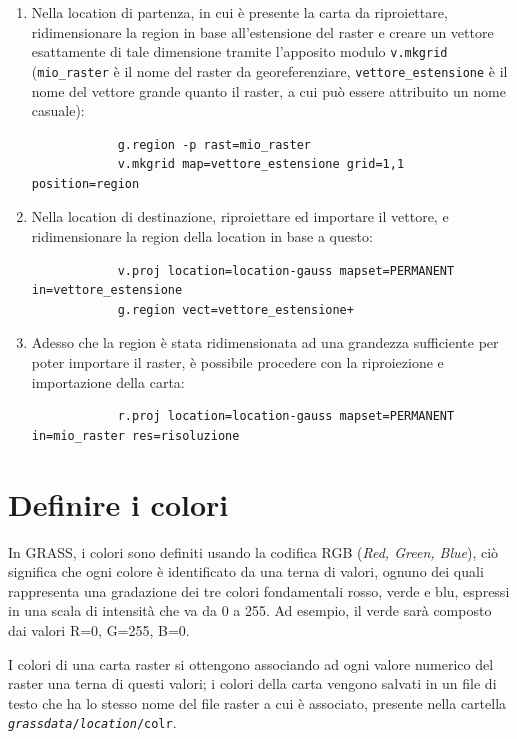 	\begin{enumerate}
		\item Nella location di partenza, in cui è presente la carta da riproiettare, ridimensionare la region in base all'estensione del raster e creare un vettore esattamente di tale dimensione tramite l'apposito modulo \texttt{v.mkgrid} (\texttt{mio\_raster} è il nome del raster da georeferenziare, \texttt{vettore\_estensione} è il nome del vettore grande quanto il raster, a cui può essere attribuito un nome casuale):

		\begin{verbatim}
			g.region -p rast=mio_raster
			v.mkgrid map=vettore_estensione grid=1,1 position=region
		\end{verbatim}
		
		\item Nella location di destinazione, riproiettare ed importare il vettore, e ridimensionare la region della location in base a questo:

		\begin{verbatim}
			v.proj location=location-gauss mapset=PERMANENT in=vettore_estensione
			g.region vect=vettore_estensione+
		\end{verbatim}
	
		\item Adesso che la region è stata ridimensionata ad una grandezza sufficiente per poter importare il raster, è possibile procedere con la riproiezione e importazione della carta:

		\begin{verbatim}
			r.proj location=location-gauss mapset=PERMANENT in=mio_raster res=risoluzione
		\end{verbatim}
	\end{enumerate}

\section{Definire i colori}
	In GRASS, i colori sono definiti usando la codifica RGB (\emph{Red, Green, Blue}), ciò significa che ogni colore è identificato da una terna di valori, ognuno dei quali rappresenta una gradazione dei tre colori fondamentali rosso, verde e blu, espressi in una scala di intensità che va da 0 a 255. Ad esempio, il verde sarà composto dai valori R=0, G=255, B=0.
	
	I colori di una carta raster si ottengono associando ad ogni valore numerico del raster una terna di questi valori; i colori della carta vengono salvati in un file di testo che ha lo stesso nome del file raster a cui è associato, presente nella cartella \texttt{\emph{grassdata}}\texttt{/}\texttt{\emph{location}}\texttt{/colr}.

